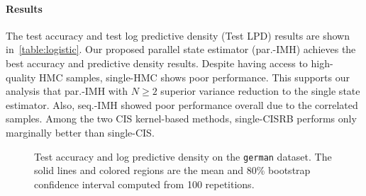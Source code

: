 \vspace{-0.05in}
\paragraph{Results}
The test accuracy and test log predictive density (Test LPD) results are shown in~\cref{table:logistic}.
Our proposed parallel state estimator (par.-IMH) achieves the best accuracy and predictive density results.
Despite having access to high-quality HMC samples, single-HMC shows poor performance.
This supports our analysis that par.-IMH with \(N \geq 2\) superior variance reduction to the single state estimator.
Also, seq.-IMH showed poor performance overall due to the correlated samples.
Among the two CIS kernel-based methods, single-CISRB performs only marginally better than single-CIS.

\begin{figure}[h]
  \centering
    \vspace{-0.05in}
  \caption{Test accuracy and log predictive density on the \texttt{german} dataset.
    The solid lines and colored regions are the mean and 80\% bootstrap confidence interval computed from 100 repetitions.
  }\label{fig:logistic}
  \vspace{-0.1in}
\end{figure}
%
  \vspace{-0.1in}
